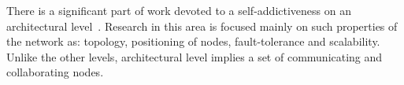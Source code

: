 There is a significant part of work devoted to a self-addictiveness on an
architectural level~\cite{}. Research in this area is focused mainly on such
properties of the network as: topology, positioning of nodes, fault-tolerance
and scalability. Unlike the other levels, architectural level implies a set of
communicating and collaborating nodes.



